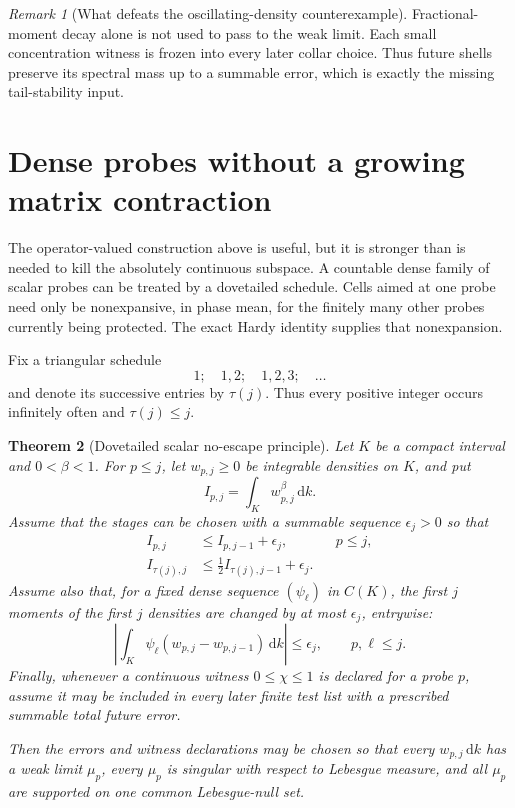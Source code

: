 \documentclass[11pt]{article}
\newtheorem{theorem}{Theorem}[section]
\theoremstyle{remark}
\newtheorem{remark}[theorem]{Remark}
\newcommand{\dd}{\,\mathrm d}
\begin{document}
\begin{remark}[What defeats the oscillating-density counterexample]
Fractional-moment decay alone is not used to pass to the weak limit.  Each
small concentration witness is frozen into every later collar choice.  Thus
future shells preserve its spectral mass up to a summable error, which is
exactly the missing tail-stability input.
\end{remark}

\section{Dense probes without a growing matrix contraction}

The operator-valued construction above is useful, but it is stronger than is
needed to kill the absolutely continuous subspace.  A countable dense family
of scalar probes can be treated by a dovetailed schedule.  Cells aimed at one
probe need only be nonexpansive, in phase mean, for the finitely many other
probes currently being protected.  The exact Hardy identity supplies that
nonexpansion.

Fix a triangular schedule
\[
 1;\quad 1,2;\quad 1,2,3;\quad\ldots
\]
and denote its successive entries by $\tau(j)$.  Thus every positive integer
occurs infinitely often and $\tau(j)\leq j$.

\begin{theorem}[Dovetailed scalar no-escape principle]
\label{thm:scalar-dovetail}
Let $K$ be a compact interval and $0<\beta<1$.  For $p\leq j$, let
$w_{p,j}\geq0$ be integrable densities on $K$, and put
\[
 I_{p,j}=\int_K w_{p,j}^{\beta}\dd k.
\]
Assume that the stages can be chosen with a summable sequence
$\epsilon_j>0$ so that
\begin{align}
 I_{p,j}&\leq I_{p,j-1}+\epsilon_j,
       &&p\leq j,                                      \label{eq:dovetail-nonexpand}\\
 I_{\tau(j),j}&\leq \tfrac12 I_{\tau(j),j-1}+\epsilon_j.\label{eq:dovetail-contract}
\end{align}
Assume also that, for a fixed dense sequence $(\psi_\ell)$ in $C(K)$,
the first $j$ moments of the first $j$ densities are changed by at most
$\epsilon_j$, entrywise:
\begin{equation}
 \left|\int_K\psi_\ell(w_{p,j}-w_{p,j-1})\dd k\right|
 \leq\epsilon_j,
 \qquad p,\ell\leq j.
 \label{eq:dovetail-moments}
\end{equation}
Finally, whenever a continuous witness $0\leq\chi\leq1$ is declared for a
probe $p$, assume it may be included in every later finite test list with a
prescribed summable total future error.

Then the errors and witness declarations may be chosen so that every
$w_{p,j}\dd k$ has a weak limit $\mu_p$, every $\mu_p$ is singular with
respect to Lebesgue measure, and all $\mu_p$ are supported on one common
Lebesgue-null set.
\end{theorem}
\end{document}
